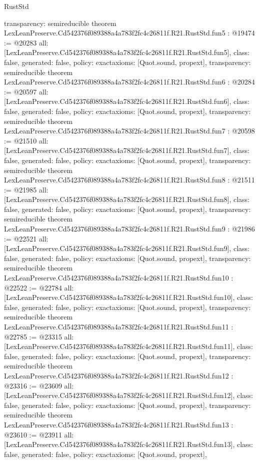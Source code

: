 \begin{lexlean}{RustStd}
\begin{coremodule}
{  transparency: semireducible
}
theorem LexLeanPreserve.Cd542376f089388a4a783f2fc4c26811f.R21.RustStd.fun5 : @19474 := @20283 {
  all: [LexLeanPreserve.Cd542376f089388a4a783f2fc4c26811f.R21.RustStd.fun5],
  class: false,
  generated: false,
  policy: exact{axioms: [Quot.sound, propext]},
  transparency: semireducible
}
theorem LexLeanPreserve.Cd542376f089388a4a783f2fc4c26811f.R21.RustStd.fun6 : @20284 := @20597 {
  all: [LexLeanPreserve.Cd542376f089388a4a783f2fc4c26811f.R21.RustStd.fun6],
  class: false,
  generated: false,
  policy: exact{axioms: [Quot.sound, propext]},
  transparency: semireducible
}
theorem LexLeanPreserve.Cd542376f089388a4a783f2fc4c26811f.R21.RustStd.fun7 : @20598 := @21510 {
  all: [LexLeanPreserve.Cd542376f089388a4a783f2fc4c26811f.R21.RustStd.fun7],
  class: false,
  generated: false,
  policy: exact{axioms: [Quot.sound, propext]},
  transparency: semireducible
}
theorem LexLeanPreserve.Cd542376f089388a4a783f2fc4c26811f.R21.RustStd.fun8 : @21511 := @21985 {
  all: [LexLeanPreserve.Cd542376f089388a4a783f2fc4c26811f.R21.RustStd.fun8],
  class: false,
  generated: false,
  policy: exact{axioms: [Quot.sound, propext]},
  transparency: semireducible
}
theorem LexLeanPreserve.Cd542376f089388a4a783f2fc4c26811f.R21.RustStd.fun9 : @21986 := @22521 {
  all: [LexLeanPreserve.Cd542376f089388a4a783f2fc4c26811f.R21.RustStd.fun9],
  class: false,
  generated: false,
  policy: exact{axioms: [Quot.sound, propext]},
  transparency: semireducible
}
theorem LexLeanPreserve.Cd542376f089388a4a783f2fc4c26811f.R21.RustStd.fun10 : @22522 := @22784 {
  all: [LexLeanPreserve.Cd542376f089388a4a783f2fc4c26811f.R21.RustStd.fun10],
  class: false,
  generated: false,
  policy: exact{axioms: [Quot.sound, propext]},
  transparency: semireducible
}
theorem LexLeanPreserve.Cd542376f089388a4a783f2fc4c26811f.R21.RustStd.fun11 : @22785 := @23315 {
  all: [LexLeanPreserve.Cd542376f089388a4a783f2fc4c26811f.R21.RustStd.fun11],
  class: false,
  generated: false,
  policy: exact{axioms: [Quot.sound, propext]},
  transparency: semireducible
}
theorem LexLeanPreserve.Cd542376f089388a4a783f2fc4c26811f.R21.RustStd.fun12 : @23316 := @23609 {
  all: [LexLeanPreserve.Cd542376f089388a4a783f2fc4c26811f.R21.RustStd.fun12],
  class: false,
  generated: false,
  policy: exact{axioms: [Quot.sound, propext]},
  transparency: semireducible
}
theorem LexLeanPreserve.Cd542376f089388a4a783f2fc4c26811f.R21.RustStd.fun13 : @23610 := @23911 {
  all: [LexLeanPreserve.Cd542376f089388a4a783f2fc4c26811f.R21.RustStd.fun13],
  class: false,
  generated: false,
  policy: exact{axioms: [Quot.sound, propext]},
}
\end{coremodule}
\end{lexlean}
